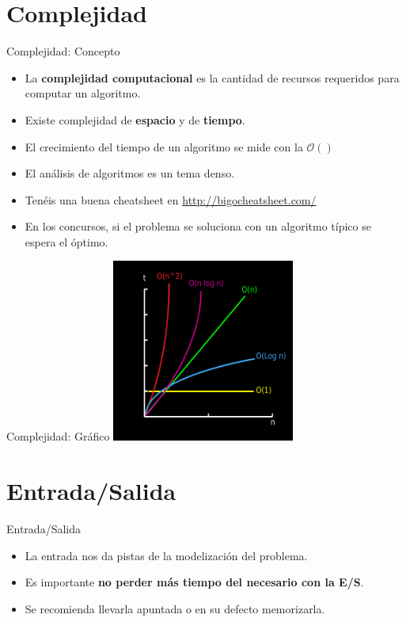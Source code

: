 \documentclass[10pt,handout]{beamer}
\begin{document}
\section{Complejidad}
\begin{frame}{Complejidad: Concepto}
  \begin{itemize}
  \item La \textbf{complejidad computacional} es la cantidad de recursos requeridos para
    computar un algoritmo.
  \item Existe complejidad de \textbf{espacio} y de \textbf{tiempo}.
  \item El crecimiento del tiempo de un algoritmo se mide con la $\mathcal{O}()$
  \item El análisis de algoritmos es un tema denso.
  \item Tenéis una buena cheatsheet en \href{http://bigocheatsheet.com/}{http://bigocheatsheet.com/}
  \item En los concursos, si el problema se soluciona con un algoritmo típico se espera el óptimo.
  \end{itemize}
\end{frame}
\begin{frame}{Complejidad: Gráfico}
  \centering \includegraphics[height=6cm]{growth.png}
\end{frame}

\section{Entrada/Salida}
\begin{frame}{Entrada/Salida}
  \begin{itemize}
  \item La entrada nos da pistas de la modelización del problema. \pause
  \item Es importante \textbf{no perder más tiempo del necesario con la E/S}. \pause
  \item Se recomienda llevarla apuntada o en su defecto memorizarla.
  \end{itemize}
\end{frame}
\end{document}
